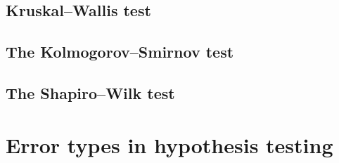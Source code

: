 \subsection{Kruskal--Wallis test}

\subsection{The Kolmogorov--Smirnov test}

\subsection{The Shapiro--Wilk test}

\section{Error types in hypothesis testing}

